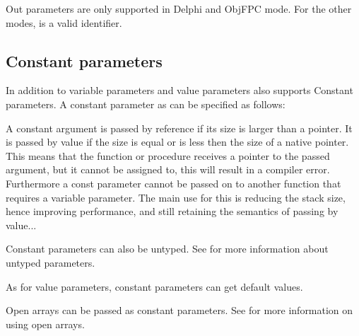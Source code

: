 \begin{remark}
Out parameters are only supported in Delphi and ObjFPC mode. For the other 
modes,  is a valid identifier.
\end{remark}

%
\subsection{Constant parameters}
In addition to variable parameters and value parameters \fpc also supports
Constant parameters. A constant parameter as can be specified as follows:

A constant argument is passed by reference if its size is larger than a
pointer. It is passed by value if the size is equal or is less then the 
size of a native pointer.
This means that the function or procedure receives a pointer to the passed
argument, but it cannot be assigned to, this will result in a
compiler error. Furthermore a const parameter cannot be passed on to another
function that requires a variable parameter.
The main use for this is reducing the stack size, hence improving
performance, and still retaining the semantics of passing by value...

Constant parameters can also be untyped. See  for more
information about untyped parameters.

As for value parameters, constant parameters can get default values.

Open arrays can be passed as constant parameters. See  for
more information on using open arrays.

